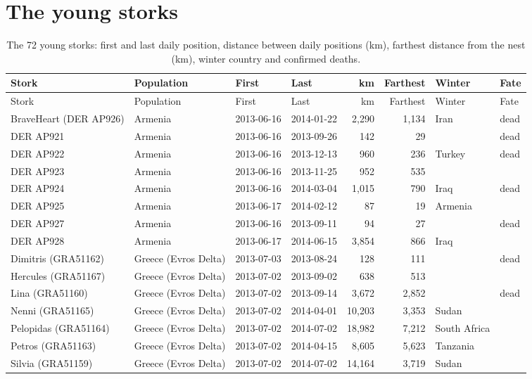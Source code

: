 \documentclass[11pt,a4paper]{article}
\begin{document}
\clearpage
\appendix
\section{The young storks}
{\footnotesize\setlength{\tabcolsep}{4pt}\begin{longtable}{llllrrll}\caption{The 72 young storks: first and last daily position, distance between daily positions (km), farthest distance from the nest (km), winter country and confirmed deaths.}\label{tab:storks}\\\toprule Stork & Population & First & Last & km & Farthest & Winter & Fate\\\midrule\endfirsthead\toprule Stork & Population & First & Last & km & Farthest & Winter & Fate\\\midrule\endhead
BraveHeart (DER AP926) & Armenia & 2013-06-16 & 2014-01-22 & 2,290 & 1,134 & Iran & dead\\
DER AP921 & Armenia & 2013-06-16 & 2013-09-26 & 142 & 29 &  & dead\\
DER AP922 & Armenia & 2013-06-16 & 2013-12-13 & 960 & 236 & Turkey & dead\\
DER AP923 & Armenia & 2013-06-16 & 2013-11-25 & 952 & 535 &  & \\
DER AP924 & Armenia & 2013-06-16 & 2014-03-04 & 1,015 & 790 & Iraq & dead\\
DER AP925 & Armenia & 2013-06-17 & 2014-02-12 & 87 & 19 & Armenia & \\
DER AP927 & Armenia & 2013-06-16 & 2013-09-11 & 94 & 27 &  & dead\\
DER AP928 & Armenia & 2013-06-17 & 2014-06-15 & 3,854 & 866 & Iraq & \\
Dimitris (GRA51162) & Greece (Evros Delta) & 2013-07-03 & 2013-08-24 & 128 & 111 &  & dead\\
Hercules (GRA51167) & Greece (Evros Delta) & 2013-07-02 & 2013-09-02 & 638 & 513 &  & \\
Lina (GRA51160) & Greece (Evros Delta) & 2013-07-02 & 2013-09-14 & 3,672 & 2,852 &  & dead\\
Nenni (GRA51165) & Greece (Evros Delta) & 2013-07-02 & 2014-04-01 & 10,203 & 3,353 & Sudan & \\
Pelopidas (GRA51164) & Greece (Evros Delta) & 2013-07-02 & 2014-07-02 & 18,982 & 7,212 & South Africa & \\
Petros (GRA51163) & Greece (Evros Delta) & 2013-07-02 & 2014-04-15 & 8,605 & 5,623 & Tanzania & \\
Silvia (GRA51159) & Greece (Evros Delta) & 2013-07-02 & 2014-07-02 & 14,164 & 3,719 & Sudan & \\

\end{longtable}}
\end{document}
